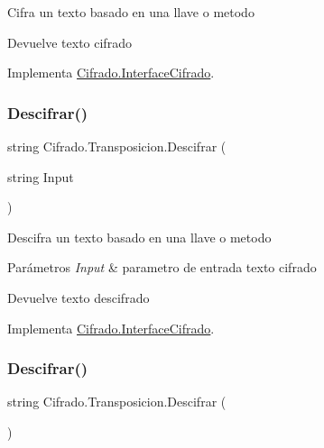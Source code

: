 Cifra un texto basado en una llave o metodo 

\begin{DoxyReturn}{Devuelve}
texto cifrado
\end{DoxyReturn}


Implementa \hyperlink{interface_cifrado_1_1_interface_cifrado_ade6b2a14d9cd48feec78c2695a2149bc}{Cifrado.\+Interface\+Cifrado}.

\mbox{\label{class_cifrado_1_1_transposicion_a45a8f6d97d2afdf5691c7197ae0187c4}} 
\subsubsection{\texorpdfstring{Descifrar()}{Descifrar()}\hspace{0.1cm}{\footnotesize\ttfamily [1/2]}}
{\footnotesize\ttfamily string Cifrado.\+Transposicion.\+Descifrar (\begin{DoxyParamCaption}\item[{string}]{Input }\end{DoxyParamCaption})}



Descifra un texto basado en una llave o metodo 


\begin{DoxyParams}{Parámetros}
{\em Input} & parametro de entrada texto cifrado\\
\hline
\end{DoxyParams}
\begin{DoxyReturn}{Devuelve}
texto descifrado
\end{DoxyReturn}


Implementa \hyperlink{interface_cifrado_1_1_interface_cifrado_af7035203a5d4212ddcca039351dd3a22}{Cifrado.\+Interface\+Cifrado}.

\mbox{\label{class_cifrado_1_1_transposicion_ac2934aaba73bbaca8e5da6b788cf10b2}} 
\subsubsection{\texorpdfstring{Descifrar()}{Descifrar()}\hspace{0.1cm}{\footnotesize\ttfamily [2/2]}}
{\footnotesize\ttfamily string Cifrado.\+Transposicion.\+Descifrar (\begin{DoxyParamCaption}{ }\end{DoxyParamCaption})}



